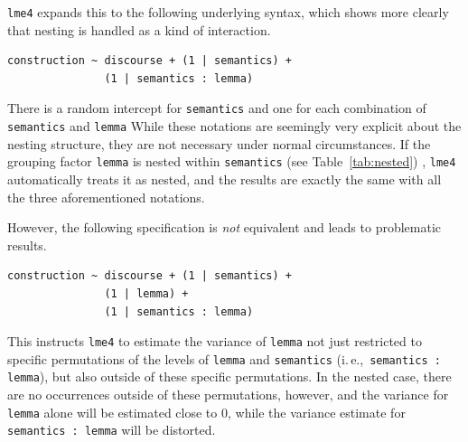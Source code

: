 \documentclass[a4paper,12pt]{article}
\newcommand{\ie}{i.\,e.,\ }
\begin{document}
\texttt{lme4} expands this to the following underlying syntax, which shows more clearly that nesting is handled as a kind of interaction.

\vspace{0.5\baselineskip}

\begin{lstlisting}
construction ~ discourse + (1 | semantics) +
               (1 | semantics : lemma)
\end{lstlisting}

There is a random intercept for \texttt{semantics} and one for each combination of \texttt{semantics} and \texttt{lemma}
While these notations are seemingly very explicit about the nesting structure, they are not necessary under normal circumstances.
If the grouping factor \texttt{lemma} is nested within \texttt{semantics} (see Table~\ref{tab:nested})
, \texttt{lme4} automatically treats it as nested, and the results are exactly the same with all the three aforementioned notations.

However, the following specification is \textit{not} equivalent and leads to problematic results.

\vspace{0.5\baselineskip}

\begin{lstlisting}
construction ~ discourse + (1 | semantics) +
               (1 | lemma) +
               (1 | semantics : lemma)
\end{lstlisting}

This instructs \texttt{lme4} to estimate the variance of \texttt{lemma} not just restricted to specific permutations of the levels of \texttt{lemma} and \texttt{semantics} (\ie \texttt{semantics : lemma}), but also outside of these specific permutations.
In the nested case, there are no occurrences outside of these permutations, however, and the variance for \texttt{lemma} alone will be estimated close to $0$, while the variance estimate for \texttt{semantics : lemma} will be distorted.
\end{document}
